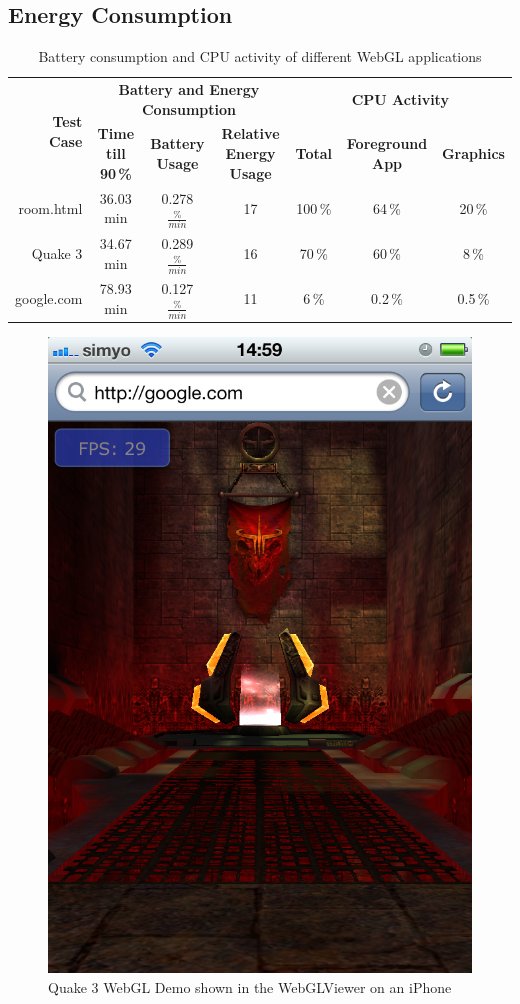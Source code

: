 \documentclass[12pt,journal,compsoc]{IEEEtran}
\begin{document}
\subsection{Energy Consumption}

\begin{table}[tb]
	\begin{centering}
	\begin{tabular}{r|c|c|c|c|c|c}
		\multirow{2}{*}{\textbf{Test Case}} & \multicolumn{3}{c|}{\textbf{Battery and Energy Consumption}}						 & \multicolumn{3}{c}{\textbf{CPU Activity}}					\\
 							&\textbf{Time till 90\,\%} & \textbf{Battery Usage}	& \textbf{Relative Energy Usage} & \textbf{Total} 	& \textbf{Foreground App} 		& \textbf{Graphics}	\\
		\hline
		room.html		   &	36.03 min				& 0.278 $\frac{\%}{min}$	&	17							& 100\,\%			& 64\,\%						& 20\,\%			\\
		Quake 3			   &	34.67 min				& 0.289 $\frac{\%}{min}$	&	16							& 70\,\%			& 60\,\%						& 8\,\%			\\
		google.com		   &	78.93 min				& 0.127	$\frac{\%}{min}$	&	11							& 6\,\%				& 0.2\,\%						& 0.5\,\%		\\
	\end{tabular}
	\caption{Battery consumption and CPU activity of different WebGL applications\label{batteryTable}}
	\end{centering}
\end{table}

\begin{figure}[htb]
	\centerline{\includegraphics[width=0.6\columnwidth]{grafiken/quake3}}
	\caption{Quake 3 WebGL Demo \cite{quakewebgl} shown in the WebGLViewer on an iPhone}
	\label{fig:quake3}
\end{figure}
\end{document}
